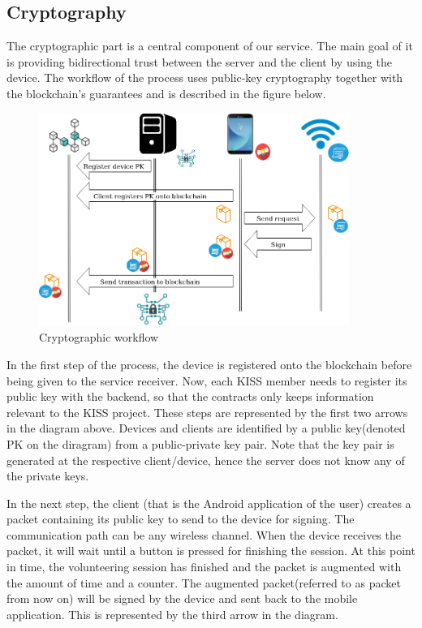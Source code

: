 \documentclass[12pt]{report}
\begin{document}
\subsection{Cryptography}\label{crypto}
The cryptographic part is a central component of our service. The main goal of it is providing bidirectional trust between the server and the client by using the device. The workflow of the process uses public-key cryptography together with the blockchain's guarantees and is described in the figure below.

\begin{figure}[h]
	\centering
	\includegraphics[width=0.9\textwidth]{crypto.png}
	\caption{Cryptographic workflow}
	\label{label:file_name}
\end{figure}

In the first step of the process, the device is registered onto the blockchain before being given to the service receiver. Now, each KISS member needs to register its public key with the backend, so that the contracts only keeps information relevant to the KISS project. These steps are represented by the first two arrows in the diagram above. Devices and clients are identified by a public key(denoted PK on the diragram) from a public-private key pair. Note that the key pair is generated at the respective client/device, hence the server does not know any of the private keys.

In the next step, the client (that is the Android application of the user) creates a packet containing its public key to send to the device for signing. The communication path can be any wireless channel. When the device receives the packet, it will wait until a button is pressed for finishing the session. At this point in time, the volunteering session has finished and the packet is augmented with the amount of time and a counter. The augmented packet(referred to as packet from now on) will be signed by the device and sent back to the mobile application. This is represented by the third arrow in the diagram.
\end{document}

